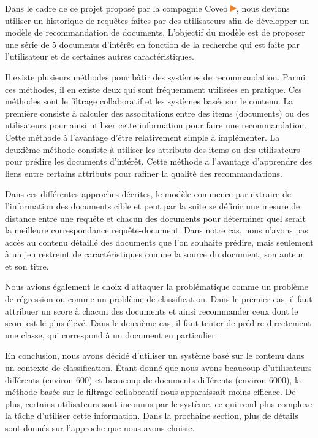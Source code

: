 Dans le cadre de ce projet proposé par la compagnie Coveo \href{https://www.coveo.com/fr}{\includegraphics[height=0.3cm]{coveo_logo}}, nous devions utiliser un historique de requêtes faites par des utilisateurs afin de développer un modèle de recommandation de documents. 
L'objectif du modèle est de proposer une série de 5 documents d'intérêt en fonction de la recherche qui est faite par l'utilisateur et de certaines autres caractéristiques. \break

Il existe plusieurs méthodes pour bâtir des systèmes de recommandation. Parmi ces méthodes, il en existe deux qui sont fréquemment utilisées en pratique. Ces méthodes sont le filtrage collaboratif et les systèmes basés sur le contenu. La première consiste à calculer des associtations entre des items (documents) ou des utilisateurs pour ainsi utiliser cette information pour faire une recommandation. Cette méthode à l'avantage d'être relativement simple à implémenter. La deuxième méthode consiste à utiliser les attributs des items ou des utilisateurs pour prédire les documents d'intérêt. Cette méthode a l'avantage d'apprendre des liens entre certains attributs pour rafiner la qualité des recommandations.

Dans ces différentes approches décrites, le modèle commence par extraire de l'information des documents cible et peut par la suite se définir une mesure de distance entre une requête et chacun des documents pour déterminer quel serait la meilleure correspondance requête-document. Dans notre cas, nous n'avons pas accès au contenu détaillé des documents que l'on souhaite prédire, mais seulement à un jeu restreint de caractéristiques comme la source du document, son auteur et son titre.

Nous avions également le choix d'attaquer la problématique comme un problème de régression ou comme un problème de classification. Dans le premier cas, il faut attribuer un score à chacun des documents et ainsi recommander ceux dont le score est le plus élevé. Dans le deuxième cas, il faut tenter de prédire directement une classe, qui correspond à un document en particulier. 

En conclusion, nous avons décidé d'utiliser un système basé sur le contenu dans un contexte de classification. Étant donné que nous avons beaucoup d'utilisateurs différents (environ 600) et beaucoup de documents différents (environ 6000), la méthode basée sur le filtrage collaboratif nous apparaissait moins efficace. De plus, certains utilisateurs sont inconnus par le système, ce qui rend plus complexe la tâche d'utiliser cette information. Dans la prochaine section, plus de détails sont donnés sur l'approche que nous avons choisie.